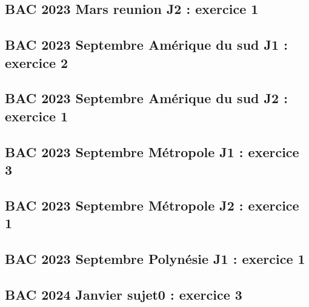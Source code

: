 \documentclass[lang=fr,edition=teacher,layout=sheet]{mxbook}
\begin{document}
\begingroup\endgroup
\par\bigskip
{}\subsection*{BAC 2023 Mars reunion J2 : exercice 1}
\begingroup\endgroup
\par\bigskip
{}\subsection*{BAC 2023 Septembre Amérique du sud J1 : exercice 2}
\begingroup\endgroup
\par\bigskip
{}\subsection*{BAC 2023 Septembre Amérique du sud J2 : exercice 1}
\begingroup\endgroup
\par\bigskip
{}\subsection*{BAC 2023 Septembre Métropole J1 : exercice 3}
\begingroup\endgroup
\par\bigskip
{}\subsection*{BAC 2023 Septembre Métropole J2 : exercice 1}
\begingroup\endgroup
\par\bigskip
{}\subsection*{BAC 2023 Septembre Polynésie J1 : exercice 1}
\begingroup\endgroup
\par\bigskip
{}\subsection*{BAC 2024 Janvier sujet0 : exercice 3}
\end{document}
